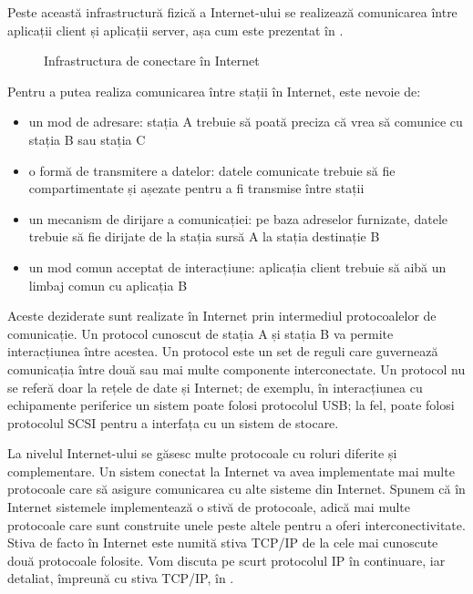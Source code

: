 Peste această infrastructură fizică a Internet-ului se realizează comunicarea între aplicații client și aplicații server, așa cum este prezentat în .

\begin{figure}[htbp]
  \centering
  \def\svgwidth{\columnwidth}
  
  \caption{Infrastructura de conectare în Internet}
  \label{fig:net:internet-infrastructure}
\end{figure}

Pentru a putea realiza comunicarea între stații în Internet, este nevoie de:

\begin{itemize}
  \item un mod de adresare: stația A trebuie să poată preciza că vrea să comunice cu stația B sau stația C
  \item o formă de transmitere a datelor: datele comunicate trebuie să fie compartimentate și așezate pentru a fi transmise între stații
  \item un mecanism de dirijare a comunicației: pe baza adreselor furnizate, datele trebuie să fie dirijate de la stația sursă A la stația destinație B
  \item un mod comun acceptat de interacțiune: aplicația client trebuie să aibă un limbaj comun cu aplicația B
\end{itemize}

Aceste deziderate sunt realizate în Internet prin intermediul protocoalelor de comunicație. Un protocol cunoscut de stația A și stația B va permite interacțiunea între acestea. Un protocol este un set de reguli care guvernează comunicația între două sau mai multe componente interconectate. Un protocol nu se referă doar la rețele de date și Internet; de exemplu, în interacțiunea cu echipamente periferice un sistem poate folosi protocolul USB; la fel, poate folosi protocolul SCSI pentru a interfața cu un sistem de stocare.

La nivelul Internet-ului se găsesc multe protocoale cu roluri diferite și complementare. Un sistem conectat la Internet va avea implementate mai multe protocoale care să asigure comunicarea cu alte sisteme din Internet. Spunem că în Internet sistemele implementează o stivă de protocoale, adică mai multe protocoale care sunt construite unele peste altele pentru a oferi interconectivitate. Stiva de facto în Internet este numită stiva TCP/IP de la cele mai cunoscute două protocoale folosite. Vom discuta pe scurt protocolul IP în continuare, iar detaliat, împreună cu stiva TCP/IP, în .

